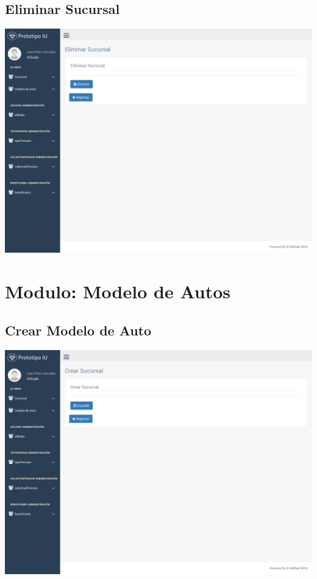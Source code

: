 \documentclass[10pt, letterpaper]{report}
\begin{document}
\subsection{Eliminar Sucursal}

\includegraphics[width=\linewidth]{ui-prototype/SucursalServices/EliminarSucursalPage.png}


\section{Modulo: Modelo de Autos}

\subsection{Crear Modelo de Auto}

\includegraphics[width=\linewidth]{ui-prototype/SucursalServices/CrearSucursalPage.png}
\end{document}
